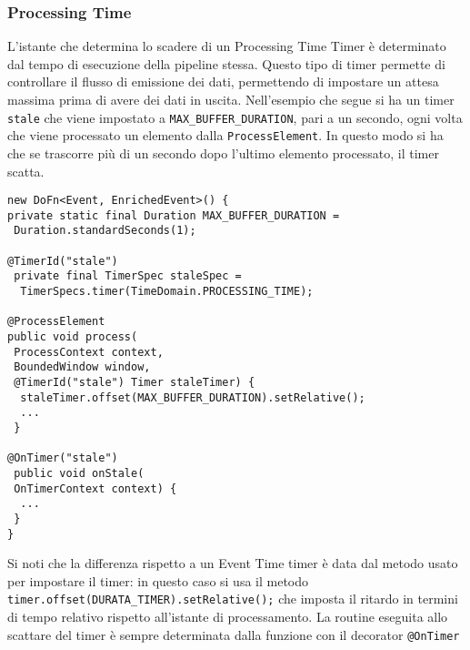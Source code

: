 \subsubsection{Processing Time}
L'istante che determina lo scadere di un Processing Time Timer è determinato dal tempo di esecuzione della pipeline stessa. Questo tipo di timer permette di controllare il flusso di emissione dei dati, permettendo di impostare un attesa massima prima di avere dei dati in uscita. Nell'esempio che segue si ha un timer \texttt{stale} che viene impostato a \texttt{MAX\_BUFFER\_DURATION}, pari a un secondo, ogni volta che viene processato un elemento dalla \texttt{ProcessElement}. In questo modo si ha che se trascorre più di un secondo dopo l'ultimo elemento processato, il timer scatta.
\begin{lstlisting}
new DoFn<Event, EnrichedEvent>() {
private static final Duration MAX_BUFFER_DURATION =
 Duration.standardSeconds(1);

@TimerId("stale")
 private final TimerSpec staleSpec =
  TimerSpecs.timer(TimeDomain.PROCESSING_TIME);

@ProcessElement
public void process(
 ProcessContext context,
 BoundedWindow window,
 @TimerId("stale") Timer staleTimer) {
  staleTimer.offset(MAX_BUFFER_DURATION).setRelative();
  ...
 }

@OnTimer("stale")
 public void onStale(
 OnTimerContext context) {
  ...
 }
}
\end{lstlisting}
Si noti che la differenza rispetto a un Event Time timer è data dal metodo usato per impostare il timer: in questo caso si usa il metodo \texttt{timer.offset(DURATA\_TIMER)\allowbreak.setRelative();} che imposta il ritardo in termini di tempo relativo rispetto all'istante di processamento. La routine eseguita allo scattare del timer è sempre determinata dalla funzione con il decorator \texttt{@OnTimer}
